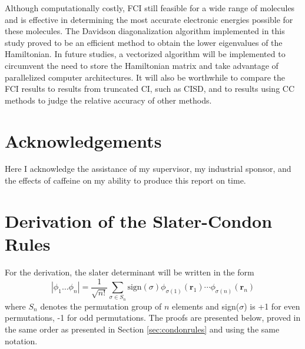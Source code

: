 \documentclass[final,3p,times,twocolumn]{elsarticle}
\begin{document}
Although computationally costly, FCI still feasible for a wide range of molecules and is effective in determining the most accurate electronic energies possible for these molecules. The Davidson diagonalization algorithm implemented in this study proved to be an efficient method to obtain the lower eigenvalues of the Hamiltonian. In future studies, a vectorized algorithm will be implemented to circumvent the need to store the Hamiltonian matrix and take advantage of parallelized computer architectures.\cite{handy-1983} It will also be worthwhile to compare the FCI results to results from truncated CI, such as CISD, and to results using CC methods to judge the relative accuracy of other methods.

\section*{Acknowledgements}
Here I acknowledge the assistance of my supervisor, my industrial sponsor,
and the effects of caffeine on my ability to produce this report on time.

\appendix

\section{Derivation of the Slater-Condon Rules}
\label{app:slatercondon}
For the derivation, the slater determinant will be written in the form
\begin{equation}
|\phi_1 \ldots \phi_n| = \dfrac{1}{\sqrt{n!}}\sum_{\sigma\in S_n} \text{sign}(\sigma) \phi_{\sigma(1)}(\mathbf{r}_1) \cdots \phi_{\sigma(n)}(\mathbf{r}_n)
\end{equation}
where $S_n$ denotes the permutation group of $n$ elements and sign($\sigma$) is +1 for even permutations, -1 for odd permutations. The proofs are presented below, proved in the same order as presented in Section \ref{sec:condonrules} and using the same notation.
\end{document}

